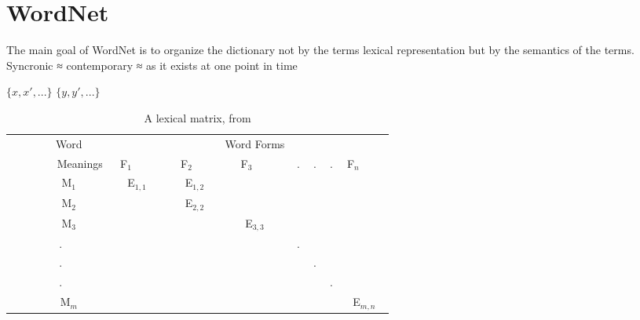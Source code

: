 \section{WordNet}
The main goal of WordNet is to organize the dictionary not by the terms lexical representation but by the semantics of the terms.\citep{Miller1990}
Syncronic ≈ contemporary ≈ as it exists at one point in time

$\{x,x',...\}$ $\{y,y',...\}$
\begin{table}[ht]
	\centering
	\begin{tabular}{|c||ccccccc|}
		\hline
	        Word     & 	~		 & ~		 & Word Forms & ~ & ~ & ~ & ~		  \\ 
	        Meanings & F$_1$     & F$_2$     & F$_3$      & . & . & . & F$_n$     \\ \hline
	        M$_1$    & E$_{1,1}$ & E$_{1,2}$ & ~          & ~ & ~ & ~ & ~         \\ 
	        M$_2$    & ~         & E$_{2,2}$ & ~          & ~ & ~ & ~ & ~         \\ 
	        M$_3$    & ~         & ~         & E$_{3,3}$  & ~ & ~ & ~ & ~         \\ 
	        .        & ~         & ~         & ~          & . & ~ & ~ & ~         \\ 
	        .        & ~         & ~         & ~          & ~ & . & ~ & ~         \\ 
	        .        & ~         & ~         & ~          & ~ & ~ & . & ~         \\  
	        M$_m$    & ~         & ~         & ~          & ~ & ~ & ~ & E$_{m,n}$ \\
		\hline
	\end{tabular}
	\caption{A lexical matrix, from \citet{Miller1990}}
	\label{table:LexicalMatrix}
\end{table}

